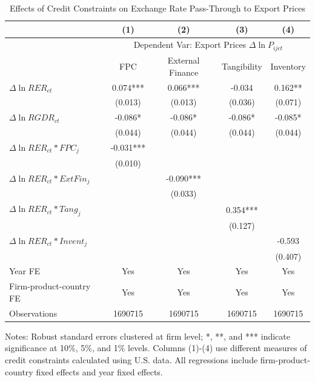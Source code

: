 \begin{table}[H]
	\centering
	\caption{Effects of Credit Constraints on Exchange Rate Pass-Through to Export Prices}
	\begin{threeparttable}	
		\begin{tabular}{lcccc}
			\toprule
			& (1)   & (2)   & (3)   & (4) \\
			\midrule
                & \multicolumn{4}{c}{Dependent Var: Export Prices $\Delta \ln P_{ijct}$} \\
			& FPC   & External Finance & Tangibility & Inventory \\
			\midrule
			$\Delta \ln RER_{ct}$ & 0.074*** & 0.066*** & -0.034 & 0.162** \\
			& (0.013) & (0.013) & (0.036) & (0.071) \\
			$\Delta \ln RGDR_{ct}$ & -0.086* & -0.086* & -0.086* & -0.085* \\
			& (0.044) & (0.044) & (0.044) & (0.044) \\
			$\Delta \ln RER_{ct}*FPC_{j}$ & -0.031*** &       &       &  \\
			& (0.010) &       &       &  \\
			$\Delta \ln RER_{ct}*ExtFin_{j}$ &  & -0.090*** &       &  \\
			&  & (0.033) &       &  \\
			$\Delta \ln RER_{ct}*Tang_{j}$ &     &       & 0.354*** &  \\
			&     &       & (0.127) &  \\
			$\Delta \ln RER_{ct}*Invent_{j}$ &     &       &       & -0.593 \\
			&    &       &       & (0.407) \\
                \midrule
			Year FE  & Yes   & Yes   & Yes   & Yes \\
			Firm-product-country FE & Yes   & Yes   & Yes   & Yes \\
			Observations & 1690715 & 1690715 & 1690715 & 1690715 \\
			\bottomrule
		\end{tabular}
		\begin{tablenotes}
			\footnotesize
			\item Notes: Robust standard errors clustered at firm level; *, **, and *** indicate significance at 10\%, 5\%, and 1\% levels. Columns (1)-(4) use different measures of credit constraints calculated using U.S. data. All regressions include firm-product-country fixed effects and year fixed effects.
		\end{tablenotes}
	\end{threeparttable}
	\label{tab.credit.exp}
\end{table}

